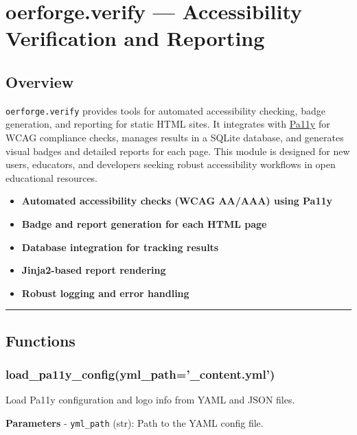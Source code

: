 \section{oerforge.verify --- Accessibility Verification and
Reporting}\label{oerforge.verify-accessibility-verification-and-reporting}

\subsection{Overview}\label{overview}

\texttt{oerforge.verify} provides tools for automated accessibility
checking, badge generation, and reporting for static HTML sites. It
integrates with \href{https://pa11y.org/}{Pa11y} for WCAG compliance
checks, manages results in a SQLite database, and generates visual
badges and detailed reports for each page. This module is designed for
new users, educators, and developers seeking robust accessibility
workflows in open educational resources.

\begin{itemize}
\tightlist
\item
  \textbf{Automated accessibility checks (WCAG AA/AAA) using Pa11y}
\item
  \textbf{Badge and report generation for each HTML page}
\item
  \textbf{Database integration for tracking results}
\item
  \textbf{Jinja2-based report rendering}
\item
  \textbf{Robust logging and error handling}
\end{itemize}

\begin{center}\rule{0.5\linewidth}{0.5pt}\end{center}

\subsection{Functions}\label{functions}

\subsubsection{load\_pa11y\_config(yml\_path='\_content.yml')}\label{load_pa11y_configyml_path_content.yml}

Load Pa11y configuration and logo info from YAML and JSON files.

\textbf{Parameters} - \texttt{yml\_path} (str): Path to the YAML config
file.

